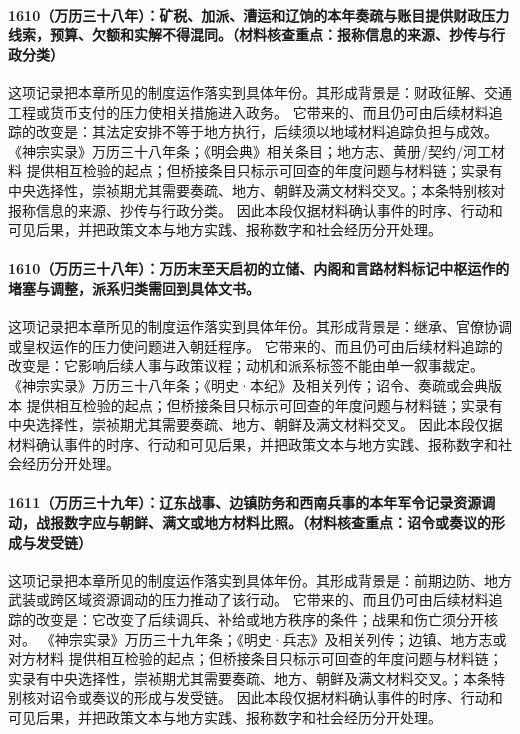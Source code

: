 \paragraph{1610（万历三十八年）：矿税、加派、漕运和辽饷的本年奏疏与账目提供财政压力线索，预算、欠额和实解不得混同。（材料核查重点：报称信息的来源、抄传与行政分类）} 这项记录把本章所见的制度运作落实到具体年份。其形成背景是：财政征解、交通工程或货币支付的压力使相关措施进入政务。 它带来的、而且仍可由后续材料追踪的改变是：其法定安排不等于地方执行，后续须以地域材料追踪负担与成效。 《神宗实录》万历三十八年条；《明会典》相关条目；地方志、黄册/契约/河工材料 提供相互检验的起点；但桥接条目只标示可回查的年度问题与材料链；实录有中央选择性，崇祯期尤其需要奏疏、地方、朝鲜及满文材料交叉。；本条特别核对报称信息的来源、抄传与行政分类。 因此本段仅据材料确认事件的时序、行动和可见后果，并把政策文本与地方实践、报称数字和社会经历分开处理。

\paragraph{1610（万历三十八年）：万历末至天启初的立储、内阁和言路材料标记中枢运作的堵塞与调整，派系归类需回到具体文书。} 这项记录把本章所见的制度运作落实到具体年份。其形成背景是：继承、官僚协调或皇权运作的压力使问题进入朝廷程序。 它带来的、而且仍可由后续材料追踪的改变是：它影响后续人事与政策议程；动机和派系标签不能由单一叙事裁定。 《神宗实录》万历三十八年条；《明史·本纪》及相关列传；诏令、奏疏或会典版本 提供相互检验的起点；但桥接条目只标示可回查的年度问题与材料链；实录有中央选择性，崇祯期尤其需要奏疏、地方、朝鲜及满文材料交叉。 因此本段仅据材料确认事件的时序、行动和可见后果，并把政策文本与地方实践、报称数字和社会经历分开处理。

\paragraph{1611（万历三十九年）：辽东战事、边镇防务和西南兵事的本年军令记录资源调动，战报数字应与朝鲜、满文或地方材料比照。（材料核查重点：诏令或奏议的形成与发受链）} 这项记录把本章所见的制度运作落实到具体年份。其形成背景是：前期边防、地方武装或跨区域资源调动的压力推动了该行动。 它带来的、而且仍可由后续材料追踪的改变是：它改变了后续调兵、补给或地方秩序的条件；战果和伤亡须分开核对。 《神宗实录》万历三十九年条；《明史·兵志》及相关列传；边镇、地方志或对方材料 提供相互检验的起点；但桥接条目只标示可回查的年度问题与材料链；实录有中央选择性，崇祯期尤其需要奏疏、地方、朝鲜及满文材料交叉。；本条特别核对诏令或奏议的形成与发受链。 因此本段仅据材料确认事件的时序、行动和可见后果，并把政策文本与地方实践、报称数字和社会经历分开处理。

